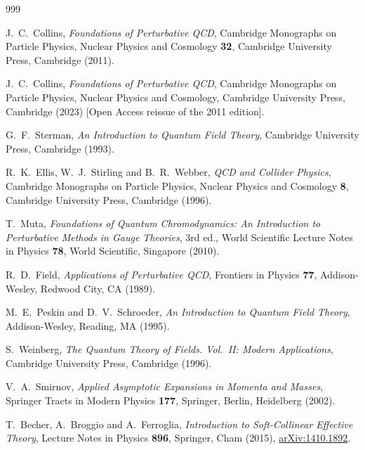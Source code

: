 \begin{thebibliography}{999}

J.~C.~Collins, \emph{Foundations of Perturbative QCD}, Cambridge Monographs on Particle Physics, Nuclear Physics and Cosmology \textbf{32}, Cambridge University Press, Cambridge (2011).

J.~C.~Collins, \emph{Foundations of Perturbative QCD}, Cambridge Monographs on Particle Physics, Nuclear Physics and Cosmology, Cambridge University Press, Cambridge (2023) [Open Access reissue of the 2011 edition].

G.~F.~Sterman, \emph{An Introduction to Quantum Field Theory}, Cambridge University Press, Cambridge (1993).

R.~K.~Ellis, W.~J.~Stirling and B.~R.~Webber, \emph{QCD and Collider Physics}, Cambridge Monographs on Particle Physics, Nuclear Physics and Cosmology \textbf{8}, Cambridge University Press, Cambridge (1996).

T.~Muta, \emph{Foundations of Quantum Chromodynamics: An Introduction to Perturbative Methods in Gauge Theories}, 3rd ed., World Scientific Lecture Notes in Physics \textbf{78}, World Scientific, Singapore (2010).

R.~D.~Field, \emph{Applications of Perturbative QCD}, Frontiers in Physics \textbf{77}, Addison-Wesley, Redwood City, CA (1989).

M.~E.~Peskin and D.~V.~Schroeder, \emph{An Introduction to Quantum Field Theory}, Addison-Wesley, Reading, MA (1995).

S.~Weinberg, \emph{The Quantum Theory of Fields. Vol.~II: Modern Applications}, Cambridge University Press, Cambridge (1996).

V.~A.~Smirnov, \emph{Applied Asymptotic Expansions in Momenta and Masses}, Springer Tracts in Modern Physics \textbf{177}, Springer, Berlin, Heidelberg (2002).

T.~Becher, A.~Broggio and A.~Ferroglia, \emph{Introduction to Soft-Collinear Effective Theory}, Lecture Notes in Physics \textbf{896}, Springer, Cham (2015), \href{https://arxiv.org/abs/1410.1892}{arXiv:1410.1892}.


\end{thebibliography}
